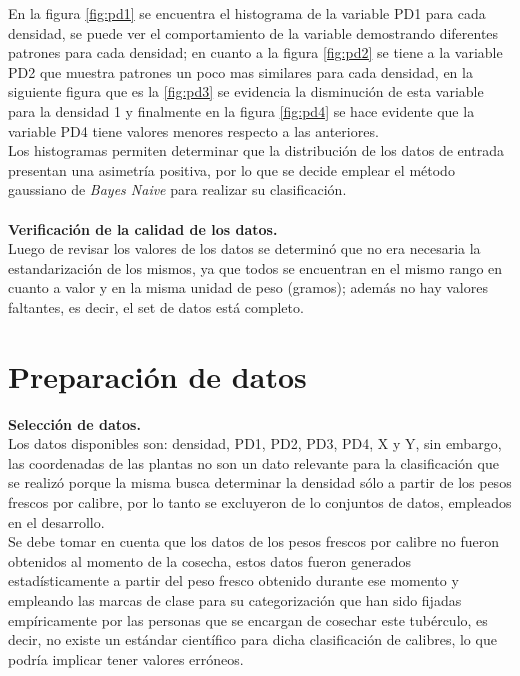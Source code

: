 En la figura \ref{fig:pd1} se encuentra el histograma de la variable PD1 para cada densidad, se puede ver el comportamiento de la variable demostrando diferentes patrones para cada densidad; en cuanto a la figura \ref{fig:pd2} se tiene a la variable PD2 que muestra patrones un poco mas similares para cada densidad, en la siguiente figura que es la \ref{fig:pd3} se evidencia la disminución de esta variable para la densidad 1 y finalmente en la figura \ref{fig:pd4} se hace evidente que la variable PD4 tiene valores menores respecto a las anteriores.\\

Los histogramas permiten determinar que la distribución de los datos de entrada presentan  una asimetría positiva, por lo que se decide  emplear el método gaussiano de \textit{Bayes Naive} para realizar su clasificación.\\\\

\noindent
\textbf{Verificación de la calidad de los datos.}\\

Luego de revisar los valores de los datos se determinó que no era necesaria la estandarización de los mismos, ya que todos se encuentran en el mismo rango en cuanto a valor y en la misma unidad de peso (gramos); además no hay valores faltantes, es decir, el set de datos está completo.

\section{Preparación de datos}

\noindent
\textbf{Selección de datos.}\\

Los datos disponibles son: densidad, PD1, PD2, PD3, PD4, X y Y, sin embargo, las coordenadas de las
plantas no son un dato relevante para la clasificación que se realizó porque la misma busca determinar
la densidad sólo a partir de los pesos frescos por calibre, por lo tanto se excluyeron de lo conjuntos  de datos, empleados en el desarrollo.\\

Se debe tomar en cuenta que los datos de los pesos frescos por calibre no fueron obtenidos al momento de la cosecha, estos datos fueron generados estadísticamente a partir del peso fresco obtenido durante ese momento y empleando las marcas de clase para su categorización que han sido fijadas empíricamente por las personas que se encargan de cosechar este tubérculo, es decir, no existe un estándar científico para dicha clasificación de calibres, lo que podría implicar tener valores erróneos.\\

